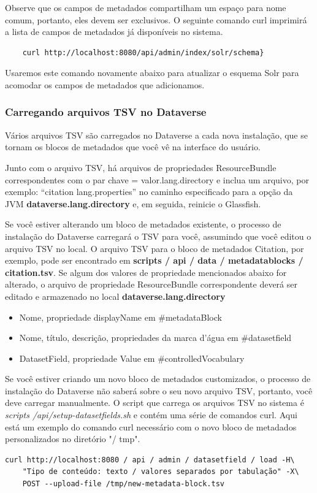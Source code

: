 \documentclass[12pt,hidelinks]{article}
\begin{document}
\qquad Observe que os campos de metadados compartilham um espaço para nome comum, portanto, eles devem ser exclusivos. O seguinte comando curl imprimirá a lista de campos de metadados já disponíveis no sistema.
    \begin{verbatim}
    curl http://localhost:8080/api/admin/index/solr/schema}
    \end{verbatim}
Usaremos este comando novamente abaixo para atualizar o esquema Solr para acomodar os campos de metadados que adicionamos.

\subsubsection{Carregando arquivos TSV no Dataverse}

\qquad Vários arquivos TSV são carregados no Dataverse a cada nova instalação, que se tornam os blocos de metadados que você vê na interface do usuário.

Junto com o arquivo TSV, há arquivos de propriedades ResourceBundle correspondentes com o par chave = valor.lang.directory e inclua um arquivo, por exemplo: “citation lang.properties” no caminho especificado para a opção da JVM 
\textbf{dataverse.lang.directory} e, em seguida, reinicie o Glassfish.

Se você estiver alterando um bloco de metadados existente, o processo de instalação do Dataverse carregará o TSV para você, assumindo que você editou o arquivo TSV no local. O arquivo TSV para o bloco de metadados Citation, por exemplo, pode ser encontrado em  \textbf{scripts / api / data / metadatablocks / citation.tsv}. Se algum dos valores de propriedade mencionados abaixo for alterado, o arquivo de propriedade ResourceBundle correspondente deverá ser editado e armazenado no local \textbf{dataverse.lang.directory}

\begin{itemize}
    
\item Nome, propriedade displayName em \#metadataBlock
\item Nome, título, descrição, propriedades da marca d'água em \#datasetfield
\item DatasetField, propriedade Value em \#controlledVocabulary

\end{itemize}

Se você estiver criando um novo bloco de metadados customizados, o processo de instalação do Dataverse não saberá sobre o seu novo arquivo TSV, portanto, você deve carregar manualmente. O script que carrega os arquivos TSV no sistema é \textit{scripts /api/setup-datasetfields.sh} e contém uma série de comandos curl. Aqui está um exemplo do comando curl necessário com o novo bloco de metadados personalizados no diretório "/ tmp".
\begin{verbatim}
curl http://localhost:8080 / api / admin / datasetfield / load -H\
    "Tipo de conteúdo: texto / valores separados por tabulação" -X\
    POST --upload-file /tmp/new-metadata-block.tsv
\end{verbatim}
\end{document}

